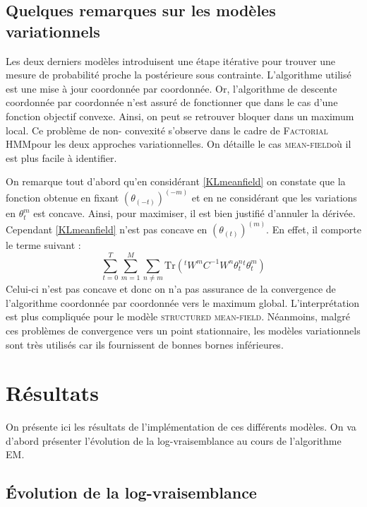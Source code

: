 \documentclass[10pt,a4paper]{article}
\newcommand{\fhmm}{\textsc{Factorial HMM}}
\newcommand{\EM}{\textsc{EM}}
\newcommand{\meanfield}{\textsc{mean-field}}
\newcommand{\structmeanfield}{\textsc{structured mean-field}}
\begin{document}
\subsection{Quelques remarques sur les modèles variationnels}
\label{rqvar}
 Les deux derniers modèles introduisent une étape itérative pour trouver une mesure de probabilité
 proche la postérieure sous contrainte. L'algorithme utilisé est une mise à jour coordonnée par 
 coordonnée. Or, l'algorithme de descente coordonnée par coordonnée n'est assuré de fonctionner que dans  le cas d'une
 fonction objectif convexe. Ainsi, on peut se retrouver bloquer dans un maximum local. Ce problème de non-
 convexité s'observe dans le cadre de \fhmm pour les deux approches variationnelles. On détaille le cas 
 \meanfield où il est plus facile à identifier. 
 
 On remarque tout d'abord qu'en considérant \ref{KLmeanfield} on constate que la fonction obtenue en
 fixant $(\theta_{(-t)})^{(-m)}$ et en ne considérant que les variations en $\theta_t^m$ est concave.
 Ainsi, pour maximiser, il est bien justifié d'annuler la dérivée. Cependant \ref{KLmeanfield} n'est
 pas concave en $(\theta_{(t)})^{(m)}$. En effet, il comporte le terme suivant :
 \begin{equation}
 \underset{t=0}{\overset{T}{\sum}}\underset{m=1}{\overset{M}{\sum}}\underset{n \neq m}{\sum}
 \text{Tr}\left( {}^tW^m C^{-1}W^n\theta_t^n {}^t\theta_t^m\right)
 \end{equation}
 Celui-ci n'est pas concave et donc on n'a pas assurance de la convergence de l'algorithme 
 coordonnée par coordonnée vers le maximum global. L'interprétation est plus compliquée pour le
 modèle \structmeanfield. Néanmoins, malgré ces problèmes de convergence vers un point stationnaire, 
 les modèles variationnels sont très utilisés car ils fournissent de bonnes bornes inférieures.
\section{Résultats}
\label{results}

On présente ici les résultats de l'implémentation de ces différents modèles.  
On va d'abord présenter l'évolution de la log-vraisemblance au cours de 
l'algorithme \EM.
\subsection{Évolution de la log-vraisemblance}
\end{document}
